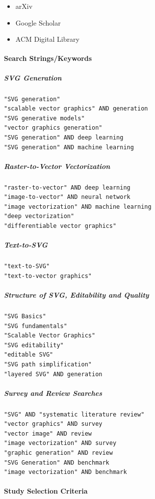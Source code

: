 \begin{itemize}
    \item arXiv
    \item Google Scholar
    \item ACM Digital Library
\end{itemize}

\paragraph{Search Strings/Keywords}

\subparagraph{SVG Generation}
\begin{verbatim}
"SVG generation"
"scalable vector graphics" AND generation
"SVG generative models"
"vector graphics generation"
"SVG generation" AND deep learning
"SVG generation" AND machine learning
\end{verbatim}

\subparagraph{Raster-to-Vector Vectorization}
\begin{verbatim}
"raster-to-vector" AND deep learning
"image-to-vector" AND neural network
"image vectorization" AND machine learning
"deep vectorization"
"differentiable vector graphics"
\end{verbatim}

\subparagraph{Text-to-SVG}
\begin{verbatim}
"text-to-SVG"
"text-to-vector graphics"
\end{verbatim}

\subparagraph{Structure of SVG, Editability and Quality}
\begin{verbatim}
"SVG Basics"
"SVG fundamentals"
"Scalable Vector Graphics"
"SVG editability"
"editable SVG"
"SVG path simplification"
"layered SVG" AND generation
\end{verbatim}

\subparagraph{Survey and Review Searches}
\begin{verbatim}
"SVG" AND "systematic literature review"
"vector graphics" AND survey
"vector image" AND review
"image vectorization" AND survey
"graphic generation" AND review
"SVG Generation" AND benchmark
"image vectorization" AND benchmark
\end{verbatim}

\paragraph{Study Selection Criteria}

